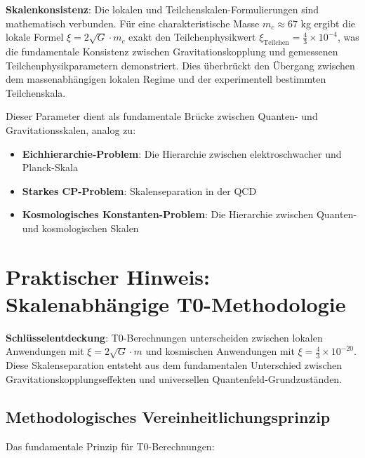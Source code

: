 \documentclass[12pt,a4paper]{article}
\begin{document}
	\textbf{Skalenkonsistenz}: Die lokalen und Teilchenskalen-Formulierungen sind mathematisch verbunden. Für eine charakteristische Masse $m_c \approx 67$ kg ergibt die lokale Formel $\xi = 2\sqrt{G} \cdot m_c$ exakt den Teilchenphysikwert $\xi_{\text{Teilchen}} = \frac{4}{3} \times 10^{-4}$, was die fundamentale Konsistenz zwischen Gravitationskopplung und gemessenen Teilchenphysikparametern demonstriert. Dies überbrückt den Übergang zwischen dem massenabhängigen lokalen Regime und der experimentell bestimmten Teilchenskala.
	
	Dieser Parameter dient als fundamentale Brücke zwischen Quanten- und Gravitationsskalen, analog zu:
	\begin{itemize}
		\item \textbf{Eichhierarchie-Problem}: Die Hierarchie zwischen elektroschwacher und Planck-Skala \citep{weinberg1995,susskind1979}
		\item \textbf{Starkes CP-Problem}: Skalenseparation in der QCD \citep{peccei1977,weinberg1978}
		\item \textbf{Kosmologisches Konstanten-Problem}: Die Hierarchie zwischen Quanten- und kosmologischen Skalen \citep{weinberg1989,carroll2001}
	\end{itemize}
	
	\section{Praktischer Hinweis: Skalenabhängige T0-Methodologie}
	\label{sec:practical_methodology}
	
	\begin{tcolorbox}[colback=green!5!white,colframe=green!75!black,title=Skalenabhängige T0-Berechnungsmethode]
		\textbf{Schlüsselentdeckung}: T0-Berechnungen unterscheiden zwischen lokalen Anwendungen mit $\xi = 2\sqrt{G} \cdot m$ und kosmischen Anwendungen mit $\xi = \frac{4}{3} \times 10^{-20}$. Diese Skalenseparation entsteht aus dem fundamentalen Unterschied zwischen Gravitationskopplungseffekten und universellen Quantenfeld-Grundzuständen.
	\end{tcolorbox}
	
	\subsection{Methodologisches Vereinheitlichungsprinzip}
	\label{subsec:methodological_unification}
	
	Das fundamentale Prinzip für T0-Berechnungen:
	
\end{document}
